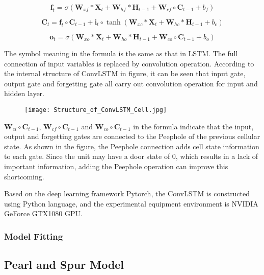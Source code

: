 \documentclass[../main]{subfiles}
\begin{document}
\begin{equation}
\mathbf{f}_t=\sigma(\mathbf{W}_{xf}*\mathbf{X}_{t}+\mathbf{W}_{hf}*\mathbf{H}_{t-1}+\mathbf{W}_{cf}\circ\mathbf{C}_{t-1}+b_f) 
\end{equation}

\begin{equation}
\mathbf{C}_t=\mathbf{f}_{t}\circ\mathbf{C}_{t-1}+\mathbf{i}_t\circ\tanh(\mathbf{W}_{xc}*\mathbf{X}_{t}+\mathbf{W}_{hc}*\mathbf{H}_{t-1}+b_c)
\end{equation}

\begin{equation}
\mathbf{o}_t=\sigma(\mathbf{W}_{xo}*\mathbf{X}_{t}+\mathbf{W}_{ho}*\mathbf{H}_{t-1}+\mathbf{W}_{co}\circ\mathbf{C}_{t-1}+b_o)
\end{equation}

The symbol meaning in the formula is the same as that in LSTM. The full
connection of input variables is replaced by convolution operation.
According to the internal structure of ConvLSTM in figure, it can be
seen that input gate, output gate and forgetting gate all carry out
convolution operation for input and hidden layer.

\begin{figure}
\centering
\texttt{[image: Structure\_of\_ConvLSTM\_Cell.jpg]}
\caption{}
\end{figure}

\(\mathbf{W}_{ci}\circ\mathbf{C}_{t-1}\),
\(\mathbf{W}_{cf}\circ\mathbf{C}_{t-1}\) and
\(\mathbf{W}_{co}\circ\mathbf{C}_{t-1}\) in the formula indicate
that the input, output and forgetting gates are connected to the
Peephole\cite{861302} of the previous cellular state. As shown in
the figure, the Peephole connection adds cell state information to each
gate. Since the unit may have a door state of 0, which results in a lack
of important information, adding the Peephole operation can improve this
shortcoming.

Based on the deep learning framework Pytorch, the ConvLSTM is
constructed using Python language, and the experimental equipment
environment is NVIDIA GeForce GTX1080 GPU.

\hypertarget{model-fitting}{%
\subsubsection{Model Fitting}\label{model-fitting}}



\subsection{Pearl and Spur Model}
\end{document}
